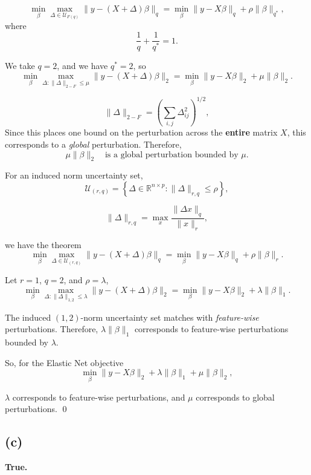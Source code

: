 \documentclass{article}
\begin{document}
\[
\min_{\beta}
\max_{\Delta \in \mathcal{U}_{F(q)}}
\|y-(X+\Delta)\beta\|_q
=
\min_{\beta}
\|y-X\beta\|_q
+
\rho\|\beta\|_{q^*},
\]
where
\[
\frac{1}{q}+\frac{1}{q^*}=1.
\]

\noindent We take \(q=2\), and we have \(q^*=2\), so
\[
\min_{\beta}
\max_{\Delta:\|\Delta\|_{2-F}\leq\mu}
\|y-(X+\Delta)\beta\|_2
=
\min_{\beta}
\|y-X\beta\|_2
+
\mu\|\beta\|_2.
\]


\[
\|\Delta\|_{2-F}
=
\left(
\sum_{i,j}\Delta_{ij}^2
\right)^{1/2},
\]
Since this places one bound on the perturbation across the \textbf{entire} matrix \(X\), this corresponds to a \emph{global}
perturbation. Therefore,
\[
\mu\|\beta\|_2
\quad\text{is a global perturbation bounded by }\mu.
\]

\noindent For an induced norm uncertainty set,
\[
\mathcal{U}_{(r,q)}
=
\left\{
\Delta \in \mathbb{R}^{n \times p}
:
\|\Delta\|_{r,q}\leq\rho
\right\},
\]


\[
\|\Delta\|_{r,q}
=
\max_x
\frac{\|\Delta x\|_q}{\|x\|_r},
\]

\noindent we have the theorem 
\[
\min_{\beta}
\max_{\Delta\in\mathcal{U}_{(r,q)}}
\|y-(X+\Delta)\beta\|_q
=
\min_{\beta}
\|y-X\beta\|_q
+
\rho\|\beta\|_r.
\]

\noindent Let \(r=1\), \(q=2\), and \(\rho=\lambda\),
\[
\min_{\beta}
\max_{\Delta:\|\Delta\|_{1,2}\leq\lambda}
\|y-(X+\Delta)\beta\|_2
=
\min_{\beta}
\|y-X\beta\|_2
+
\lambda\|\beta\|_1.
\]

\noindent The induced \((1,2)\)-norm uncertainty set
matches with \emph{feature-wise} perturbations. Therefore,
$\lambda\|\beta\|_1$ corresponds to feature-wise perturbations bounded by $\lambda$.

\vspace{3mm}

\noindent So, for the Elastic Net objective
\[
\min_{\beta}
\|y-X\beta\|_2
+
\lambda\|\beta\|_1
+
\mu\|\beta\|_2,
\]


$\lambda$ corresponds to feature-wise perturbations, and $\mu$ corresponds to global perturbations. \qed


\vspace{7mm}

\subsection*{(c)}
\textbf{True.}

\vspace{3mm}
\end{document}
